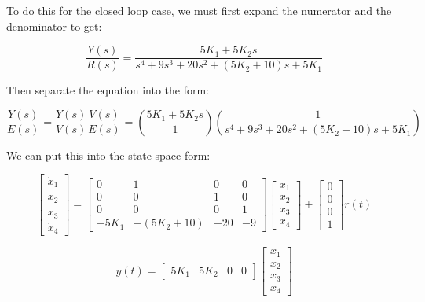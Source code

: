 \documentclass[12pt, letterpaper]{../assignment}
\begin{document}
To do this for the closed loop case, we must first expand the numerator and the denominator to get:

$$ \frac{Y(s)}{R(s)} = \frac{5 K_1 + 5 K_2 s}{s^4 + 9 s^3 + 20 s^2 + (5 K_2 + 10) s + 5 K_1} $$

Then separate the equation into the form:

$$ \frac{Y(s)}{E(s)} = \frac{Y(s)}{V(s)} \frac{V(s)}{E(s)} = \left(\frac{5 K_1 + 5 K_2 s}{1}\right) \left(\frac{1}{s^4 + 9 s^3 + 20 s^2 + (5 K_2 + 10) s + 5 K_1}\right) $$

We can put this into the state space form:

\begin{answer}
    \begin{equation*}
        \begin{bmatrix}
            \dot{x}_1\\ \dot{x}_2\\ \dot{x}_3\\ \dot{x}_4
        \end{bmatrix}=
        \begin{bmatrix}
            0 & 1 & 0 & 0 \\
            0 & 0 & 1 & 0 \\
            0 & 0 & 0 & 1 \\
            -5 K_1 & -(5 K_2 + 10) & -20 & -9
        \end{bmatrix}
        \begin{bmatrix}
            x_1\\ x_2\\ x_3\\ x_4
        \end{bmatrix}
        + \begin{bmatrix}
            0\\ 0\\ 0\\ 1
        \end{bmatrix} r(t)
    \end{equation*}
\end{answer}
\begin{answer}
    \begin{equation*}
        y(t)=
        \begin{bmatrix}
            5 K_1 & 5 K_2 & 0 & 0
        \end{bmatrix}
        \begin{bmatrix}
            x_1\\ x_2\\ x_3\\ x_4
        \end{bmatrix}
    \end{equation*}
\end{answer}
\end{document}

